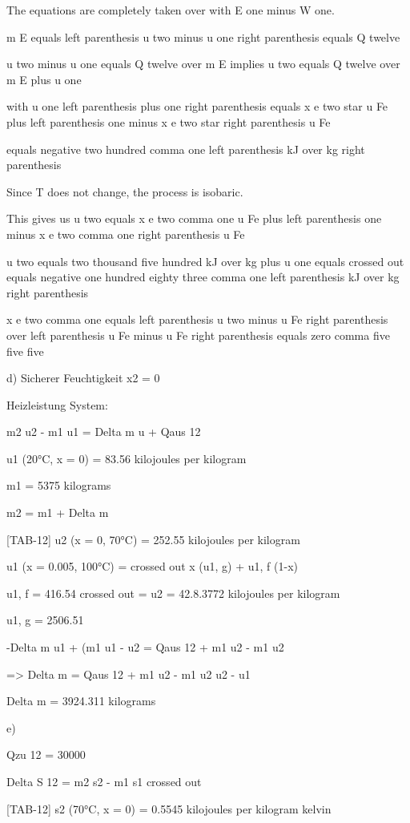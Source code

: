 The equations are completely taken over with E one minus W one.

m E equals left parenthesis u two minus u one right parenthesis equals Q twelve

u two minus u one equals Q twelve over m E implies u two equals Q twelve over m E plus u one

with u one left parenthesis plus one right parenthesis equals x e two star u Fe plus left parenthesis one minus x e two star right parenthesis u Fe

equals negative two hundred comma one left parenthesis kJ over kg right parenthesis

Since T does not change, the process is isobaric.

This gives us u two equals x e two comma one u Fe plus left parenthesis one minus x e two comma one right parenthesis u Fe

u two equals two thousand five hundred kJ over kg plus u one equals crossed out equals negative one hundred eighty three comma one left parenthesis kJ over kg right parenthesis

x e two comma one equals left parenthesis u two minus u Fe right parenthesis over left parenthesis u Fe minus u Fe right parenthesis equals zero comma five five five

d) Sicherer Feuchtigkeit x2 = 0

Heizleistung System:

m2 u2 - m1 u1 = Delta m u + Qaus 12

u1 (20°C, x = 0) = 83.56 kilojoules per kilogram

m1 = 5375 kilograms

m2 = m1 + Delta m

[TAB-12]  
u2 (x = 0, 70°C) = 252.55 kilojoules per kilogram

u1 (x = 0.005, 100°C) = crossed out x (u1, g) + u1, f (1-x)

u1, f = 416.54  
crossed out = u2 = 42.8.3772 kilojoules per kilogram

u1, g = 2506.51

-Delta m u1 + (m1 u1 - u2 = Qaus 12 + m1 u2 - m1 u2

=> Delta m = Qaus 12 + m1 u2 - m1 u2  
u2 - u1

Delta m = 3924.311 kilograms

e)

Qzu 12 = 30000

Delta S 12 = m2 s2 - m1 s1 crossed out

[TAB-12]  
s2 (70°C, x = 0) = 0.5545 kilojoules per kilogram kelvin

